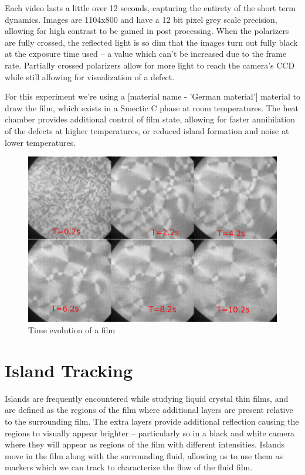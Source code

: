 \documentclass[prl,reprint,showpacs,floatfix,nofootinbib]{revtex4-1}
\begin{document}
Each video lasts a little over 12 seconds, capturing the entirety of the short term dynamics. Images are 1104x800  and have a 12 bit pixel grey scale precision, allowing for high contrast to be gained in post processing. When the polarizers are fully crossed, the reflected light is so dim that the images turn out fully black at the exposure time used -- a value which can't be increased due to the frame rate. Partially crossed polarizers allow for more light to reach the camera's CCD while still allowing for visualization of a defect.

For this experiment we're using a [material name - 'German material'] material to draw the film, which exists in a Smectic C phase at room temperatures. The heat chamber provides additional control of film state, allowing for faster annihilation of the defects at higher temperatures, or reduced island formation and noise at lower temperatures. 

\begin{figure}
  \includegraphics[width=\linewidth]{film.png}
  \caption{Time evolution of a film}
  \label{fig:frames}
\end{figure}

\section{Island Tracking}

Islands are frequently encountered while studying liquid crystal thin films, and are defined as the regions of the film where additional layers are present relative to the surrounding film. The extra layers provide additional reflection causing the regions to visually appear brighter -- particularly so in a black and white camera where they will appear as regions of the film with different intensities. Islands move in the film along with the surrounding fluid, allowing us to use them as markers which we can track to characterize the flow of the fluid film.
\end{document}
